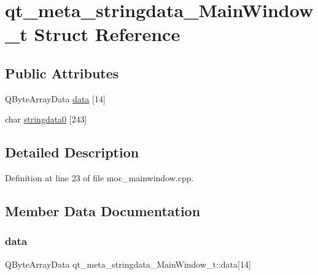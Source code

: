 \hypertarget{structqt__meta__stringdata___main_window__t}{}\section{qt\+\_\+meta\+\_\+stringdata\+\_\+\+Main\+Window\+\_\+t Struct Reference}
\label{structqt__meta__stringdata___main_window__t}
\subsection*{Public Attributes}
\begin{DoxyCompactItemize}
\item 
Q\+Byte\+Array\+Data \hyperlink{structqt__meta__stringdata___main_window__t_ad57cc890dc3b8cf35a39343e14e30337}{data} \mbox{[}14\mbox{]}
\item 
char \hyperlink{structqt__meta__stringdata___main_window__t_a6adbd76872d73405cf63968af7211971}{stringdata0} \mbox{[}243\mbox{]}
\end{DoxyCompactItemize}


\subsection{Detailed Description}


Definition at line 23 of file moc\+\_\+mainwindow.\+cpp.



\subsection{Member Data Documentation}
\mbox{\label{structqt__meta__stringdata___main_window__t_ad57cc890dc3b8cf35a39343e14e30337}} 
\subsubsection{\texorpdfstring{data}{data}}
{\footnotesize\ttfamily Q\+Byte\+Array\+Data qt\+\_\+meta\+\_\+stringdata\+\_\+\+Main\+Window\+\_\+t\+::data\mbox{[}14\mbox{]}}



